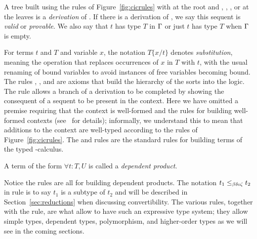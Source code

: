 \begin{defnc}
\label{def:derivvalid}
A tree built using the rules of Figure~\ref{fig:cicrules} with  at the root and , , , or  at the leaves is a \emph{derivation} of . If there is a derivation of , we say this sequent is \emph{valid} or \emph{provable}. We also say that $t$ has type $T$ in $\Gamma{}$ or just $t$ has type $T$ when $\Gamma{}$ is empty.
\end{defnc}

For terms $t$ and $T$ and variable $x$, the notation $T\{x / t\}$ denotes \emph{substitution}, meaning the operation that replaces occurrences of $x$ in $T$ with $t$, with the usual renaming of bound variables to avoid instances of free variables becoming bound. The rules , , and  are axioms that build the hierarchy of the sorts into the logic. The  rule allows a branch of a derivation to be completed by showing the consequent of a sequent to be present in the context. Here we have omitted a premise requiring that the context is well-formed and the rules for building well-formed contexts (see~\cite{coq} for details); informally, we understand this to mean that additions to the context are well-typed according to the rules of Figure~\ref{fig:cicrules}. The  and  rules are the standard rules for building terms of the typed \lambda-calculus.

\begin{defnc}
\label{def:depprod}
A term of the form $\forall t : T, U$ is called a \emph{dependent product}.
\end{defnc}

Notice the  rules are all for building dependent products. The notation $t_1 \leq_{\beta\delta\iota\zeta}{} t_2$ in rule  is to say $t_1$ is a subtype of $t_2$ and will be described in Section~\ref{sec:reductions} when discussing convertibility. The various  rules, together with the  rule, are what allow \coc{} to have such an expressive type system; they allow simple types, dependent types, polymorphism, and higher-order types as we will see in the coming sections.



